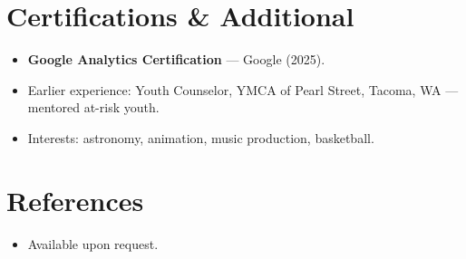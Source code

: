 \documentclass[11pt,letterpaper,sans]{moderncv}
\begin{document}

\section{Certifications \& Additional}
\vspace{1pt}
\begin{itemize}
\item{\textbf{Google Analytics Certification} --- Google (2025).}
\item{Earlier experience: Youth Counselor, YMCA of Pearl Street, Tacoma, WA --- mentored at-risk youth.}
\item{Interests: astronomy, animation, music production, basketball.}
\end{itemize}


\section{References}
\vspace{1pt}
\begin{itemize}
\item{Available upon request.}
\end{itemize}
\end{document}
